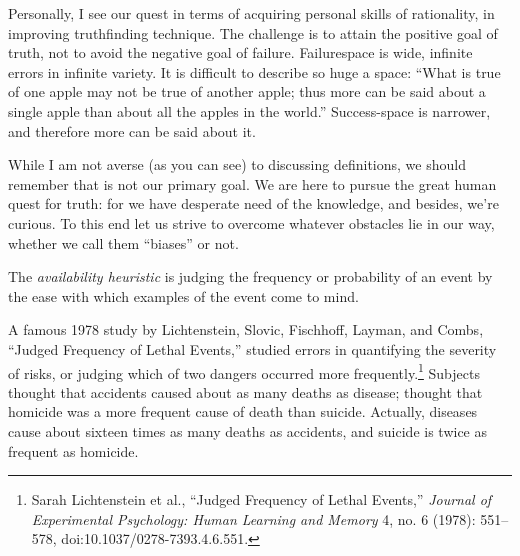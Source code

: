 {
 Personally, I see our quest in terms of acquiring personal skills
of rationality, in improving truthfinding technique. The challenge is
to attain the positive goal of truth, not to avoid the negative goal of
failure. Failurespace is wide, infinite errors in infinite variety. It
is difficult to describe so huge a space: ``What is
true of one apple may not be true of another apple; thus more can be
said about a single apple than about all the apples in the
world.'' Success-space is narrower, and therefore
more can be said about it.}

{
 While I am not averse (as you can see) to discussing definitions,
we should remember that is not our primary goal. We are here to pursue
the great human quest for truth: for we have desperate need of the
knowledge, and besides, we're curious. To this end let
us strive to overcome whatever obstacles lie in our way, whether we
call them ``biases'' or not.}

\myendsectiontext


{
 The \textit{availability heuristic} is judging the frequency or
probability of an event by the ease with which examples of the event
come to mind. }

{
 A famous 1978 study by Lichtenstein, Slovic, Fischhoff, Layman,
and Combs, ``Judged Frequency of Lethal
Events,'' studied errors in quantifying the severity
of risks, or judging which of two dangers occurred more
frequently.\footnote{Sarah Lichtenstein et al., ``Judged Frequency
of Lethal Events,'' \textit{Journal of Experimental
Psychology: Human Learning and Memory} 4, no. 6 (1978): 551--578,
doi:10.1037/0278-7393.4.6.551.} Subjects thought that accidents caused
about as many deaths as disease; thought that homicide was a more
frequent cause of death than suicide. Actually, diseases cause about
sixteen times as many deaths as accidents, and suicide is twice as
frequent as homicide.}

